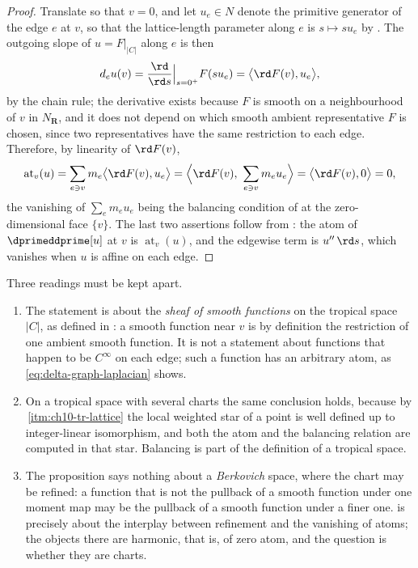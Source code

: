 \begin{proof}
Translate so that $v=0$, and let $u_e\in N$ denote the primitive generator
of the edge $e$ at $v$, so that the lattice-length parameter along $e$ is
$s\mapsto su_e$ by .  The outgoing slope of
$u=F|_{|C|}$ along $e$ is then
\[
 d_eu(v)=\frac{\rd}{\rd s}\Big|_{s=0^+}F(su_e)
 =\bigl\langle \rd F(v),u_e\bigr\rangle ,
\]
by the chain rule; the derivative exists because $F$ is smooth on a
neighbourhood of $v$ in $N_{\mathbf R}$, and it does not depend on which
smooth ambient representative $F$ is chosen, since two representatives have
the same restriction to each edge.  Therefore, by linearity of
$\rd F(v)$,
\[
 \operatorname{at}_v(u)
 =\sum_{e\ni v}m_e\bigl\langle \rd F(v),u_e\bigr\rangle
 =\Bigl\langle \rd F(v),\ \sum_{e\ni v}m_eu_e\Bigr\rangle
 =\bigl\langle \rd F(v),0\bigr\rangle=0,
\]
the vanishing of $\sum_em_eu_e$ being the balancing condition of
 at the zero-dimensional face $\{v\}$.  The
last two assertions follow from : the atom of
$\dprimeddprime[u]$ at $v$ is $\operatorname{at}_v(u)$, and the edgewise term
is $u''\,\rd s$, which vanishes when $u$ is affine on each edge.
\end{proof}

\begin{remark}
\label{rem:ch18-zero-atom-reading}
Three readings must be kept apart.
\begin{enumerate}
\item The statement is about the \emph{sheaf of smooth functions} on the
 tropical space $|C|$, as defined in : a
 smooth function near $v$ is by definition the restriction of one ambient
 smooth function.  It is not a statement about functions that happen to be
 $C^\infty$ on each edge; such a function has an arbitrary atom, as
 \eqref{eq:delta-graph-laplacian} shows.
\item On a tropical space with several charts the same conclusion holds,
 because by \,\cref{itm:ch10-tr-lattice}
 the local weighted star of a point is well defined up to integer-linear
 isomorphism, and both the atom and the balancing relation are computed in
 that star.  Balancing is part of the definition of a tropical space.
\item The proposition says nothing about a \emph{Berkovich} space, where the
 chart may be refined: a function that is not the pullback of a smooth
 function under one moment map may be the pullback of a smooth function
 under a finer one.   is precisely about the
 interplay between refinement and the vanishing of atoms; the objects there
 are harmonic, that is, of zero atom, and the question is whether they are
 charts.
\end{enumerate}
\end{remark}

